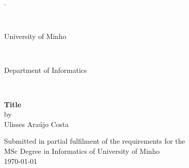 \thispagestyle{empty}
\begin{center}
\begin{tiny}.\end{tiny}\\
\vspace{3.5cm}
\begin{huge} University of Minho \end{huge} \\
\vspace{0.3cm}
\begin{LARGE} Department of Informatics \end{LARGE} \\
\vspace{5cm}

\begin{large}
\textbf{Title}\\
\vspace{0.2cm}
by\\ 
\vspace{0.2cm}
Ulisses Araújo Costa\\
\end{large}

\vspace{8cm}
Submitted in partial fulfilment of the requirements for the \\
MSc Degree in Informatics of University of Minho\\
\vspace{2cm}
\today\\
\end{center} 
